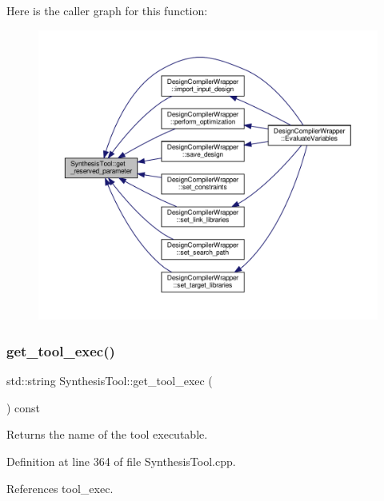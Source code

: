 Here is the caller graph for this function\+:
\nopagebreak
\begin{figure}[H]
\begin{center}
\leavevmode
\includegraphics[width=350pt]{d9/de0/classSynthesisTool_abcbbbb7757278ee775afff2e7b7459c3_icgraph}
\end{center}
\end{figure}
\mbox{\label{classSynthesisTool_abe3aeea1f961e93d41dbbcda0b8d6414}} 
\subsubsection{\texorpdfstring{get\+\_\+tool\+\_\+exec()}{get\_tool\_exec()}}
{\footnotesize\ttfamily std\+::string Synthesis\+Tool\+::get\+\_\+tool\+\_\+exec (\begin{DoxyParamCaption}{ }\end{DoxyParamCaption}) const\hspace{0.3cm}{\ttfamily [virtual]}}



Returns the name of the tool executable. 



Definition at line 364 of file Synthesis\+Tool.\+cpp.



References tool\+\_\+exec.



